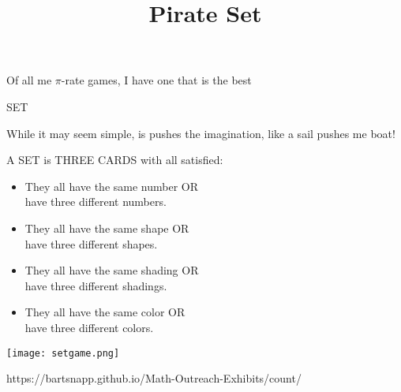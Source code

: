 \documentclass{../exhibit}
\title{Pirate Set}
\begin{document}
\begin{context}
  Of all me $\pi$-rate games, I have one that is the best
  



  \vspace{1cm}

  SET


  \vspace{1cm}

  While it may seem simple, is pushes the imagination, like a sail pushes me boat!
\end{context}



\begin{directions}
  A SET is THREE CARDS with all satisfied:\huge
  \begin{itemize}
  \item They all have the same number OR \\have three different numbers.
  \item They all have the same shape OR \\have three different shapes.
  \item They all have the same shading OR\\ have three different shadings.
  \item They all have the same color OR\\ have three different colors.
  \end{itemize}
\end{directions}



\begin{example}%
  \begin{center}
    \texttt{[image: setgame.png]}
  \end{center}
\end{example}




\begin{mathConnections}
  https://bartsnapp.github.io/Math-Outreach-Exhibits/count/
\end{mathConnections}
\end{document}
